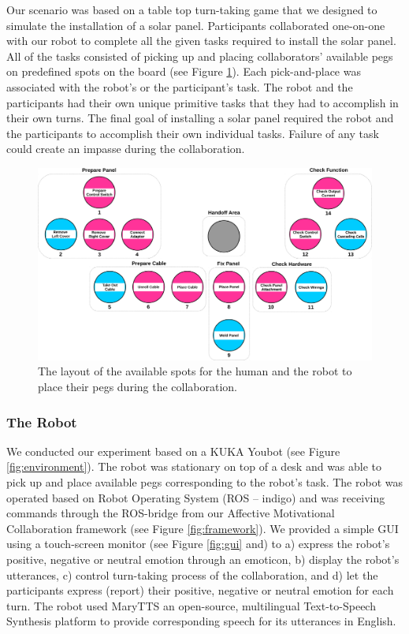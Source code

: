 \documentclass[12pt]{report}
\begin{document}
Our scenario was based on a table top turn-taking game that we designed to
simulate the installation of a solar panel. Participants collaborated one-on-one
with our robot to complete all the given tasks required to install the solar
panel. All of the tasks consisted of picking up and placing collaborators'
available pegs on predefined spots on the board (see Figure
\ref{fig:game_board}). Each pick-and-place was associated with the robot's or
the participant's task. The robot and the participants had their own unique
primitive tasks that they had to accomplish in their own turns. The final goal
of installing a solar panel required the robot and the participants to
accomplish their own individual tasks. Failure of any task could create an
impasse during the collaboration.

\begin{figure}[tbh]
  \centering
  \includegraphics[width=1\textwidth]{figure/gameBoard.pdf}
  \caption{The layout of the available spots for the human and the robot to
  place their pegs during the collaboration.}
  \label{fig:game_board}
\end{figure}

\subsubsection{The Robot}

We conducted our experiment based on a KUKA Youbot (see Figure
\ref{fig:environment}). The robot was stationary on top of a desk and was able
to pick up and place available pegs corresponding to the robot's task. The robot
was operated based on Robot Operating System (ROS -- indigo) and was receiving
commands through the ROS-bridge from our Affective Motivational Collaboration
framework (see Figure \ref{fig:framework}). We provided a simple GUI using a
touch-screen monitor (see Figure \ref{fig:gui} and) to a) express the robot's
positive, negative or neutral emotion through an emoticon, b) display the
robot's utterances, c) control turn-taking process of the collaboration, and d)
let the participants express (report) their positive, negative or neutral
emotion for each turn. The robot used MaryTTS an open-source, multilingual
Text-to-Speech Synthesis platform to provide corresponding speech for its
utterances in English.
\end{document}
